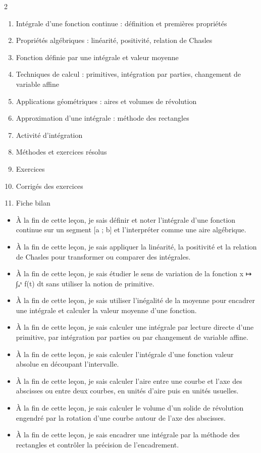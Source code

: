 \documentclass[11pt]{article}
\begin{document}
\begin{sommaire}
\begin{multicols}{2}
\begin{enumerate}
\item Intégrale d'une fonction continue : définition et premières propriétés
\item Propriétés algébriques : linéarité, positivité, relation de Chasles
\item Fonction définie par une intégrale et valeur moyenne
\item Techniques de calcul : primitives, intégration par parties, changement de variable affine
\item Applications géométriques : aires et volumes de révolution
\item Approximation d'une intégrale : méthode des rectangles
\item Activité d'intégration
\item Méthodes et exercices résolus
\item Exercices
\item Corrigés des exercices
\item Fiche bilan
\end{enumerate}
\end{multicols}
\end{sommaire}

\begin{objectifs}
\begin{itemize}
\item À la fin de cette leçon, je sais définir et noter l'intégrale d'une fonction continue sur un segment [a ; b] et l'interpréter comme une aire algébrique.
\item À la fin de cette leçon, je sais appliquer la linéarité, la positivité et la relation de Chasles pour transformer ou comparer des intégrales.
\item À la fin de cette leçon, je sais étudier le sens de variation de la fonction x ↦ ∫ₐˣ f(t) dt sans utiliser la notion de primitive.
\item À la fin de cette leçon, je sais utiliser l'inégalité de la moyenne pour encadrer une intégrale et calculer la valeur moyenne d'une fonction.
\item À la fin de cette leçon, je sais calculer une intégrale par lecture directe d'une primitive, par intégration par parties ou par changement de variable affine.
\item À la fin de cette leçon, je sais calculer l'intégrale d'une fonction valeur absolue en découpant l'intervalle.
\item À la fin de cette leçon, je sais calculer l'aire entre une courbe et l'axe des abscisses ou entre deux courbes, en unités d'aire puis en unités usuelles.
\item À la fin de cette leçon, je sais calculer le volume d'un solide de révolution engendré par la rotation d'une courbe autour de l'axe des abscisses.
\item À la fin de cette leçon, je sais encadrer une intégrale par la méthode des rectangles et contrôler la précision de l'encadrement.
\end{itemize}
\end{objectifs}
\end{document}

